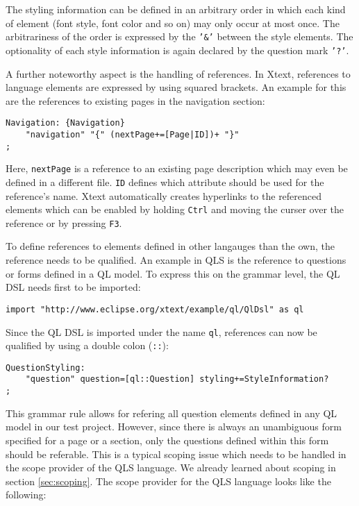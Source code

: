 The styling information can be defined in an arbitrary order in which each kind 
of element (font style, font color and so on) may only occur at 
most once. The arbitrariness of the order is expressed by the \texttt{'\&'} between
the style elements. The optionality of each style information is again declared by
the question mark \texttt{'?'}.

A further noteworthy aspect is the handling of references. In Xtext, references 
to language elements are expressed by using squared brackets. An example for this are the  
references to existing pages in the navigation section:

\begin{lstlisting}[language=Xtext]
Navigation: {Navigation}
	"navigation" "{" (nextPage+=[Page|ID])+ "}"
;
\end{lstlisting}

Here, \texttt{nextPage} is a reference to an existing page description which may even
be defined in a different file. \texttt{ID} defines which attribute should be used
for the reference's name. Xtext automatically creates hyperlinks to the referenced
elements which can be enabled by holding \texttt{Ctrl} and moving the curser over the
reference or by pressing \texttt{F3}.

To define references to elements defined in other langauges than the own,
the reference needs to be qualified. An example in QLS is the reference to questions
or forms defined in a QL model. To express this on the grammar level, the QL DSL
needs first to be imported:

\begin{lstlisting}[language=Xtext]
import "http://www.eclipse.org/xtext/example/ql/QlDsl" as ql
\end{lstlisting}

Since the QL DSL is imported under the name \texttt{ql}, references can now be 
qualified by using a double colon (\texttt{::}):

\begin{lstlisting}[language=Xtext]
QuestionStyling:
	"question" question=[ql::Question] styling+=StyleInformation?	
;
\end{lstlisting}

This grammar rule allows for refering all question elements defined in
any QL model in our test project. However, since there is always an unambiguous
form specified for a page or a section, only the questions defined within this 
form should be referable. This is a typical scoping issue which needs to be 
handled in the scope provider of the QLS language. We already learned about scoping
in section \ref{sec:scoping}. The scope provider for the QLS language looks like
the following:

